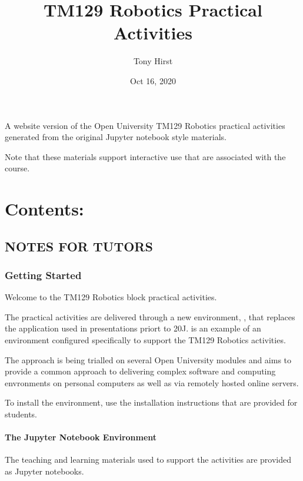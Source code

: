 \documentclass[letterpaper,10pt,english]{sphinxmanual}
\title{TM129 Robotics Practical Activities}
\date{Oct 16, 2020}
\author{Tony Hirst}
\begin{document}
\pagestyle{empty}
\sphinxmaketitle
\pagestyle{plain}
\sphinxtableofcontents
\pagestyle{normal}
\label{\detokenize{index::doc}}


A website version of the Open University TM129 Robotics practical activities generated
from the original Jupyter notebook style materials.

Note that these materials  support interactive use that are associated with the course.


\chapter{Contents:}
\label{\detokenize{index:contents}}

\section{NOTES FOR TUTORS}
\label{\detokenize{index:notes-for-tutors}}

\subsection{Getting Started}
\label{\detokenize{content/00_NOTES_FOR_TUTORS/GETTING_STARTED:Getting-Started}}\label{\detokenize{content/00_NOTES_FOR_TUTORS/GETTING_STARTED::doc}}
Welcome to the TM129 Robotics block practical activities.

The practical activities are delivered through a new environment, , that replaces the  application used in presentations priort to 20J.  is an example of an  environment configured specifically to support the TM129 Robotics activities.

The  approach is being trialled on several Open University modules and aims to provide a common approach to delivering complex software and computing envronments on personal computers as well as via remotely hosted online servers.

To install the environment, use the installation instructions that are provided for students.


\subsubsection{The Jupyter Notebook Environment}
\label{\detokenize{content/00_NOTES_FOR_TUTORS/GETTING_STARTED:The-Jupyter-Notebook-Environment}}
The teaching and learning materials used to support the activities are provided as Jupyter notebooks.
\end{document}
